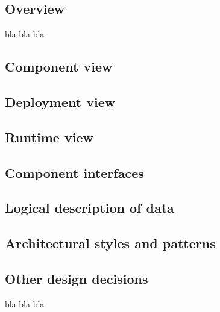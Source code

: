 

\subsection{Overview}
\label{sec:overview}
bla bla bla

\subsection{Component view}
\label{sec:component_view}


\subsection{Deployment view}
\label{sec:deployment_view}


\subsection{Runtime view}
\label{sec:runtime_view}


\subsection{Component interfaces}
\label{sec:component_interfaces}


\subsection{Logical description of data}
\label{sec:data_description}


\subsection{Architectural styles and patterns}
\label{sec:styles_patterns}


\subsection{Other design decisions}
\label{sec:other_decisionS}
bla bla bla
